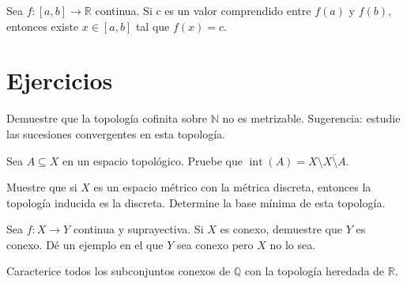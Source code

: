 \begin{corollary}\label{cor:valor-intermedio}
Sea $f\colon[a,b]\to\mathbb{R}$ continua. Si $c$ es un valor comprendido entre
$f(a)$ y $f(b)$, entonces existe $x\in[a,b]$ tal que $f(x)=c$.
\end{corollary}

\section{Ejercicios}

\begin{exercise}
Demuestre que la topología cofinita sobre $\mathbb{N}$ no es metrizable.
Sugerencia: estudie las sucesiones convergentes en esta topología.
\end{exercise}

\begin{exercise}
Sea $A\subseteq X$ en un espacio topológico. Pruebe que
$\operatorname{int}(A)=X\setminus\overline{X\setminus A}$.
\end{exercise}

\begin{exercise}
Muestre que si $X$ es un espacio métrico con la métrica discreta, entonces la
topología inducida es la discreta. Determine la base mínima de esta topología.
\end{exercise}

\begin{exercise}
Sea $f\colon X\to Y$ continua y suprayectiva. Si $X$ es conexo, demuestre que
$Y$ es conexo. Dé un ejemplo en el que $Y$ sea conexo pero $X$ no lo sea.
\end{exercise}

\begin{problem}
Caracterice todos los subconjuntos conexos de $\mathbb{Q}$ con la topología
heredada de $\mathbb{R}$.
\end{problem}
